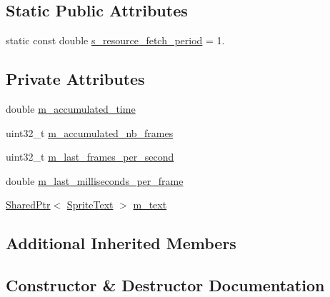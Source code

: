 \subsection*{Static Public Attributes}
\begin{DoxyCompactItemize}
\item 
static const double \hyperlink{classmage_1_1_frame_rate_script_ad28027c538faeab0c74bdb7b49f59469}{s\+\_\+resource\+\_\+fetch\+\_\+period} = 1.
\end{DoxyCompactItemize}
\subsection*{Private Attributes}
\begin{DoxyCompactItemize}
\item 
double \hyperlink{classmage_1_1_frame_rate_script_ad2811547f84f1c62392e36fd8b82042d}{m\+\_\+accumulated\+\_\+time}
\item 
uint32\+\_\+t \hyperlink{classmage_1_1_frame_rate_script_a96dc980d017ad5e1b1f00db2526cd576}{m\+\_\+accumulated\+\_\+nb\+\_\+frames}
\item 
uint32\+\_\+t \hyperlink{classmage_1_1_frame_rate_script_a6126772a3b500a0c044837f432d10976}{m\+\_\+last\+\_\+frames\+\_\+per\+\_\+second}
\item 
double \hyperlink{classmage_1_1_frame_rate_script_a648f07d3c0c140b311703cdb85c63435}{m\+\_\+last\+\_\+milliseconds\+\_\+per\+\_\+frame}
\item 
\hyperlink{namespacemage_a1e01ae66713838a7a67d30e44c67703e}{Shared\+Ptr}$<$ \hyperlink{classmage_1_1_sprite_text}{Sprite\+Text} $>$ \hyperlink{classmage_1_1_frame_rate_script_a7d55db21f500e92914293cd6850e3b53}{m\+\_\+text}
\end{DoxyCompactItemize}
\subsection*{Additional Inherited Members}


\subsection{Constructor \& Destructor Documentation}
\hypertarget{classmage_1_1_frame_rate_script_a8ef13ffd08a684cbc2010b0e4594d4cf}{}\label{classmage_1_1_frame_rate_script_a8ef13ffd08a684cbc2010b0e4594d4cf} 
